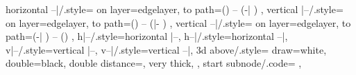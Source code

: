 {{    horizontal --|/.style={
      on layer={edgelayer},
      to path={(\tikztostart) -- (\tikztostart -| \tikztotarget) \tikztonodes}
    },
    vertical |--/.style={
      on layer={edgelayer},
      to path={(\tikztostart) -- (\tikztostart |- \tikztotarget) \tikztonodes}
    },
    vertical --|/.style={
      on layer={edgelayer},
      to path={(\tikztostart -| \tikztotarget) -- (\tikztotarget) \tikztonodes}
    },
    h|--/.style={horizontal |--},
    h--|/.style={horizontal --|},
    v|--/.style={vertical |--},
    v--|/.style={vertical --|},
    3d above/.style={
      draw=white,
      double=black,
      double distance=\pgflinewidth,
      very thick,
    },
    start subnode/.code={%
    },
}}
